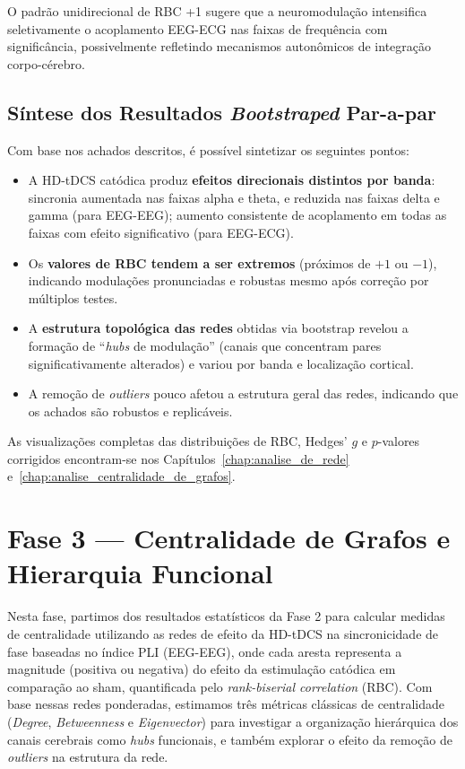 O padrão unidirecional de RBC +1 sugere que a neuromodulação intensifica seletivamente o acoplamento EEG-ECG nas faixas de frequência com significância, possivelmente refletindo mecanismos autonômicos de integração corpo-cérebro.

\subsection{Síntese dos Resultados \textit{Bootstraped} Par-a-par}

Com base nos achados descritos, é possível sintetizar os seguintes pontos:

\begin{itemize}
  \item A HD-tDCS catódica produz \textbf{efeitos direcionais distintos por banda}: sincronia aumentada nas faixas alpha e theta, e reduzida nas faixas delta e gamma (para EEG-EEG); aumento consistente de acoplamento em todas as faixas com efeito significativo (para EEG-ECG).
  \item Os \textbf{valores de RBC tendem a ser extremos} (próximos de $+1$ ou $-1$), indicando modulações pronunciadas e robustas mesmo após correção por múltiplos testes.
  \item A \textbf{estrutura topológica das redes} obtidas via bootstrap revelou a formação de ``\textit{hubs} de modulação'' (canais que concentram pares significativamente alterados) e variou por banda e localização cortical.
  \item A remoção de \textit{outliers} pouco afetou a estrutura geral das redes, indicando que os achados são robustos e replicáveis.
\end{itemize}

As visualizações completas das distribuições de RBC, Hedges' $g$ e $p$-valores corrigidos encontram-se nos Capítulos~\ref{chap:analise_de_rede} e~\ref{chap:analise_centralidade_de_grafos}.


\section{Fase 3 — Centralidade de Grafos e Hierarquia Funcional}
\label{sec:fase3_centralidade}

Nesta fase, partimos dos resultados estatísticos da Fase 2 para calcular medidas de centralidade utilizando as redes de efeito da HD-tDCS na sincronicidade de fase baseadas no índice PLI (EEG-EEG), onde cada aresta representa a magnitude (positiva ou negativa) do efeito da estimulação catódica em comparação ao sham, quantificada pelo \textit{rank-biserial correlation} (RBC). Com base nessas redes ponderadas, estimamos três métricas clássicas de centralidade (\textit{Degree}, \textit{Betweenness} e \textit{Eigenvector}) para investigar a organização hierárquica dos canais cerebrais como \textit{hubs} funcionais, e também explorar o efeito da remoção de \textit{outliers} na estrutura da rede.

